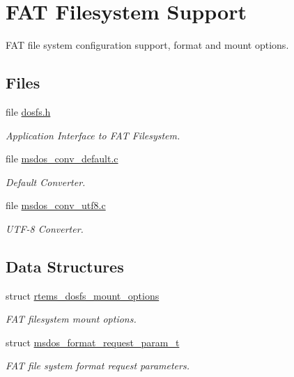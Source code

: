 \hypertarget{group__DOSFS}{}\section{F\+AT Filesystem Support}
\label{group__DOSFS}


F\+AT file system configuration support, format and mount options.  


\subsection*{Files}
\begin{DoxyCompactItemize}
\item 
file \mbox{\hyperlink{dosfs_8h}{dosfs.\+h}}
\begin{DoxyCompactList}\small\item\em Application Interface to F\+AT Filesystem. \end{DoxyCompactList}\item 
file \mbox{\hyperlink{msdos__conv__default_8c}{msdos\+\_\+conv\+\_\+default.\+c}}
\begin{DoxyCompactList}\small\item\em Default Converter. \end{DoxyCompactList}\item 
file \mbox{\hyperlink{msdos__conv__utf8_8c}{msdos\+\_\+conv\+\_\+utf8.\+c}}
\begin{DoxyCompactList}\small\item\em U\+T\+F-\/8 Converter. \end{DoxyCompactList}\end{DoxyCompactItemize}
\subsection*{Data Structures}
\begin{DoxyCompactItemize}
\item 
struct \mbox{\hyperlink{structrtems__dosfs__mount__options}{rtems\+\_\+dosfs\+\_\+mount\+\_\+options}}
\begin{DoxyCompactList}\small\item\em F\+AT filesystem mount options. \end{DoxyCompactList}\item 
struct \mbox{\hyperlink{structmsdos__format__request__param__t}{msdos\+\_\+format\+\_\+request\+\_\+param\+\_\+t}}
\begin{DoxyCompactList}\small\item\em F\+AT file system format request parameters. \end{DoxyCompactList}\end{DoxyCompactItemize}
